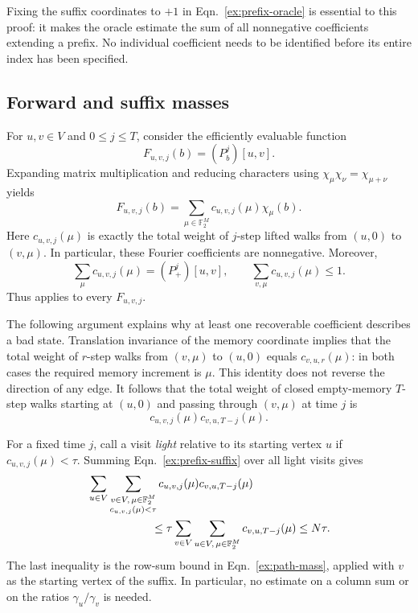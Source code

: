 \documentclass[letterpaper,11pt]{article}
\theoremstyle{definition}
\newcommand{\F}{\mathbb F}
\begin{document}
Fixing the suffix coordinates to $+1$ in
Eqn.~\eqref{ex:prefix-oracle} is essential to this proof: it makes the
oracle estimate the sum of all nonnegative coefficients extending a
prefix.  No individual coefficient needs to be identified before its
entire index has been specified.

\subsection{Forward and suffix masses}

For $u,v\in V$ and $0\leq j\leq T$, consider the efficiently
evaluable function
\[
  F_{u,v,j}(b)=(P_b^j)[u,v].
\]
Expanding matrix multiplication and reducing characters using
$\chi_\mu\chi_\nu=\chi_{\mu+\nu}$ yields
\begin{equation}
  F_{u,v,j}(b)=
  \sum_{\mu\in\F_2^M}c_{u,v,j}(\mu)\chi_\mu(b).
  \label{ex:path-fourier}
\end{equation}
Here $c_{u,v,j}(\mu)$ is exactly the total weight of $j$-step lifted
walks from $(u,0)$ to $(v,\mu)$.  In particular, these Fourier
coefficients are nonnegative.  Moreover,
\begin{equation}
  \sum_\mu c_{u,v,j}(\mu)=(P_+^j)[u,v],
  \qquad
  \sum_{v,\mu}c_{u,v,j}(\mu)\leq1.
  \label{ex:path-mass}
\end{equation}
Thus  applies to every $F_{u,v,j}$.

The following argument explains why at least one recoverable coefficient
describes a bad state.  Translation invariance of the memory coordinate
implies that the total weight of $r$-step walks from $(v,\mu)$ to
$(u,0)$ equals $c_{v,u,r}(\mu)$: in both cases the required memory
increment is $\mu$.  This identity does not reverse the direction of
any edge.  It follows that the total weight of closed empty-memory
$T$-step walks starting at $(u,0)$ and passing through $(v,\mu)$
at time $j$ is
\begin{equation}
  c_{u,v,j}(\mu)c_{v,u,T-j}(\mu).
  \label{ex:prefix-suffix}
\end{equation}

For a fixed time $j$, call a visit \emph{light} relative to its starting
vertex $u$ if $c_{u,v,j}(\mu)<\tau$.  Summing
Eqn.~\eqref{ex:prefix-suffix} over all light visits gives
\begin{align}
 &\sum_{u\in V}
   \sum_{\substack{v\in V,\,\mu\in\F_2^M\\
                    c_{u,v,j}(\mu)<\tau}}
       c_{u,v,j}(\mu)c_{v,u,T-j}(\mu)
       \notag\\
 &\hspace{20mm}\leq
       \tau\sum_{v\in V}\sum_{u\in V,\,\mu\in\F_2^M}
          c_{v,u,T-j}(\mu)
       \leq N\tau.
  \label{ex:light-mass}
\end{align}
The last inequality is the row-sum bound in
Eqn.~\eqref{ex:path-mass}, applied with $v$ as the starting vertex
of the suffix.  In particular, no estimate on a column sum or on the
ratios $\gamma_u/\gamma_v$ is needed.
\end{document}
